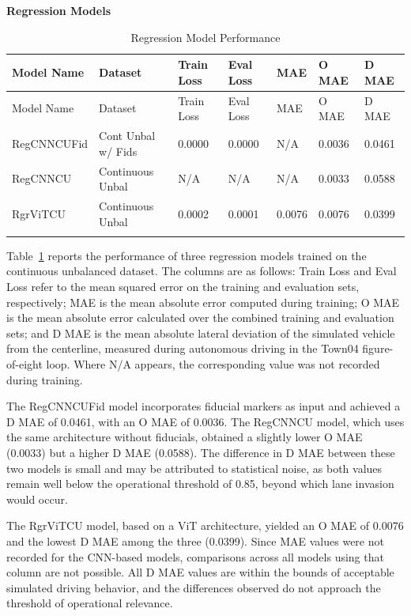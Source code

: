 \textbf{Regression Models}
\begin{longtable}{@{}lllllll@{}}
\toprule
Model Name & Dataset & Train Loss & Eval Loss & MAE & O MAE & D MAE \\
\midrule
\endfirsthead
\toprule
Model Name & Dataset & Train Loss & Eval Loss & MAE & O MAE & D MAE \\
\midrule
\endhead
RegCNNCUFid & Cont Unbal w/ Fids & 0.0000 & 0.0000 & N/A & 0.0036 & 0.0461 \\
RegCNNCU & Continuous Unbal & N/A & N/A & N/A & 0.0033 & 0.0588 \\
RgrViTCU & Continuous Unbal & 0.0002 & 0.0001 & 0.0076 & 0.0076 & 0.0399 \\
\bottomrule
\caption{Regression Model Performance}
\label{results:table_regression_models}
\end{longtable}

Table~\ref{results:table_regression_models} reports the performance of three regression models trained on the continuous unbalanced dataset. The columns are as follows: Train Loss and Eval Loss refer to the mean squared error on the training and evaluation sets, respectively; MAE is the mean absolute error computed during training; O MAE is the mean absolute error calculated over the combined training and evaluation sets; and D MAE is the mean absolute lateral deviation of the simulated vehicle from the centerline, measured during autonomous driving in the Town04 figure-of-eight loop. Where N/A appears, the corresponding value was not recorded during training.

The RegCNNCUFid model incorporates fiducial markers as input and achieved a D MAE of 0.0461, with an O MAE of 0.0036. The RegCNNCU model, which uses the same architecture without fiducials, obtained a slightly lower O MAE (0.0033) but a higher D MAE (0.0588). The difference in D MAE between these two models is small and may be attributed to statistical noise, as both values remain well below the operational threshold of 0.85, beyond which lane invasion would occur.

The RgrViTCU model, based on a ViT architecture, yielded an O MAE of 0.0076 and the lowest D MAE among the three (0.0399). Since MAE values were not recorded for the CNN-based models, comparisons across all models using that column are not possible. All D MAE values are within the bounds of acceptable simulated driving behavior, and the differences observed do not approach the threshold of operational relevance.


